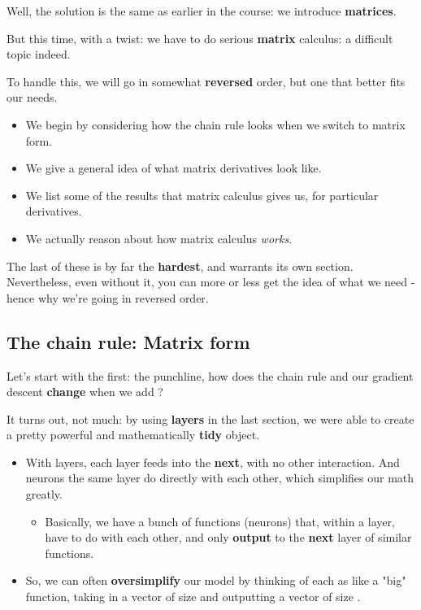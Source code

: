         Well, the solution is the same as earlier in the course: we introduce \textbf{matrices}.
        
        But this time, with a twist: we have to do serious \textbf{matrix} calculus: a difficult topic indeed.
        
        To handle this, we will go in somewhat \textbf{reversed} order, but one that better fits our needs.
        
        \begin{itemize}
            \item We begin by considering how the chain rule looks when we switch to matrix form.
            \item We give a general idea of what matrix derivatives look like.
            \item We list some of the results that matrix calculus gives us, for particular derivatives.
            \item We actually reason about how matrix calculus \textit{works}.
        \end{itemize}
        
        The last of these is by far the \textbf{hardest}, and warrants its own section. Nevertheless, even without it, you can more or less get the idea of what we need - hence why we're going in reversed order.

    \phantom{}
    
    \subsection{The chain rule: Matrix form}
    
        Let's start with the first: the punchline, how does the chain rule and our gradient descent \textbf{change} when we add ?
        
        It turns out, not much: by using \textbf{layers} in the last section, we were able to create a pretty powerful and mathematically \textbf{tidy} object.

        \begin{itemize}
            \item With layers, each layer feeds into the \textbf{next}, with no other interaction. And neurons  the same layer do  directly  with each other, which simplifies our math greatly.

            \begin{itemize}
                \item Basically, we have a bunch of functions (neurons) that, within a layer, have  to do with each other, and only \textbf{output} to the \textbf{next} layer of similar functions. 
            \end{itemize}

            
            
            \item So, we can often \textbf{oversimplify} our model by thinking of each  as like a "big" function, taking in a vector of size  and outputting a vector of size . 
        \end{itemize}
        
